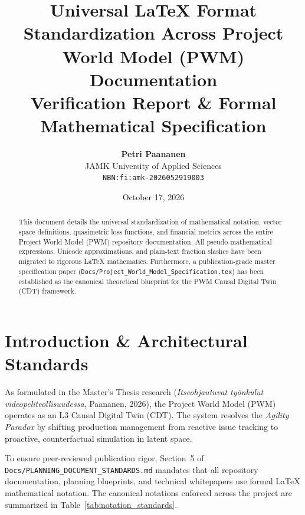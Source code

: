 \documentclass[11pt,a4paper]{article}
\title{\textbf{Universal \LaTeX{} Format Standardization Across Project World Model (PWM) Documentation}\\[0.5em]
\large Verification Report \& Formal Mathematical Specification}
\author{\textbf{Petri Paananen}\\
JAMK University of Applied Sciences\\
\texttt{NBN:fi:amk-2026052919003}}
\date{October 17, 2026}
\begin{document}
\maketitle

\begin{abstract}
This document details the universal standardization of mathematical notation, vector space definitions, quasimetric loss functions, and financial metrics across the entire Project World Model (PWM) repository documentation. All pseudo-mathematical expressions, Unicode approximations, and plain-text fraction slashes have been migrated to rigorous \LaTeX{} mathematics. Furthermore, a publication-grade master specification paper (\texttt{Docs/Project\_World\_Model\_Specification.tex}) has been established as the canonical theoretical blueprint for the PWM Causal Digital Twin (CDT) framework.
\end{abstract}

\tableofcontents
\newpage

\section{Introduction \& Architectural Standards}

As formulated in the Master's Thesis research (\textit{Itseohjautuvat työnkulut videopeliteollisuudessa}, Paananen, 2026), the Project World Model (PWM) operates as an L3 Causal Digital Twin (CDT). The system resolves the \textit{Agility Paradox} by shifting production management from reactive issue tracking to proactive, counterfactual simulation in latent space.

To ensure peer-reviewed publication rigor, Section~5 of \texttt{Docs/PLANNING\_DOCUMENT\_STANDARDS.md} mandates that all repository documentation, planning blueprints, and technical whitepapers use formal \LaTeX{} mathematical notation. The canonical notations enforced across the project are summarized in Table~\ref{tab:notation_standards}.
\end{document}
